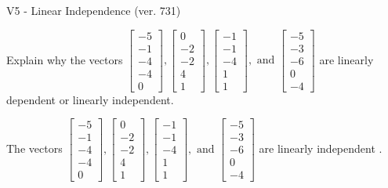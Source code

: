\begin{exercise}
  \begin{exerciseTitle}V5 - Linear Independence (ver. 731)\end{exerciseTitle}
  \begin{exerciseStatement}
    Explain why the vectors \(\left[\begin{array}{r}
-5 \\
-1 \\
-4 \\
-4 \\
0
\end{array}\right] , \left[\begin{array}{r}
0 \\
-2 \\
-2 \\
4 \\
1
\end{array}\right] , \left[\begin{array}{r}
-1 \\
-1 \\
-4 \\
1 \\
1
\end{array}\right] , \text{ and } \left[\begin{array}{r}
-5 \\
-3 \\
-6 \\
0 \\
-4
\end{array}\right]\) are linearly dependent or linearly independent.	


  \end{exerciseStatement}
  \begin{exerciseAnswer}
   The vectors \(\left[\begin{array}{r}
-5 \\
-1 \\
-4 \\
-4 \\
0
\end{array}\right] , \left[\begin{array}{r}
0 \\
-2 \\
-2 \\
4 \\
1
\end{array}\right] , \left[\begin{array}{r}
-1 \\
-1 \\
-4 \\
1 \\
1
\end{array}\right] , \text{ and } \left[\begin{array}{r}
-5 \\
-3 \\
-6 \\
0 \\
-4
\end{array}\right]\) are 
  	 linearly independent  .
  


  \end{exerciseAnswer}
\end{exercise}